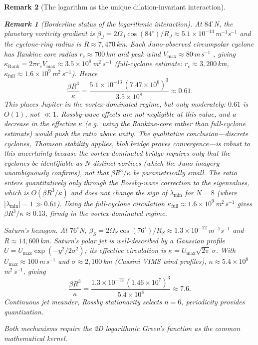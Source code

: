 \documentclass[12pt, a4paper]{article}
\newtheorem{remark}{Remark}[section]
\numberwithin{equation}{section}
\begin{document}
\begin{remark}[The logarithm as the unique dilation-invariant interaction]
\begin{remark}[Borderline status of the logarithmic interaction]
At $84^\circ$N, the planetary vorticity
gradient is $\beta_J = 2\Omega_J\cos(84^\circ)/R_J \approx
5.1\times10^{-13}$\,m$^{-1}$s$^{-1}$ and the cyclone-ring radius
is $R \approx 7{,}470$\,km.  Each Juno-observed circumpolar cyclone has
Rankine core radius $r_c \approx 700$\,km and peak wind $V_{\max}
\approx 80$\,m\,s$^{-1}$ \citep{Adriani2018,Gavriel2021}, giving
$\kappa_{\mathrm{Rank}} = 2\pi r_c V_{\max} \approx 3.5\times10^{8}$\,m$^2$\,s$^{-1}$
(full-cyclone estimate: $r_c \approx 3{,}200$\,km,
$\kappa_{\mathrm{full}} \approx 1.6\times10^9$\,m$^2$\,s$^{-1}$).
Hence
\[
  \frac{\beta R^3}{\kappa}
  = \frac{5.1\times10^{-13}\,(7.47\times10^6)^3}{3.5\times10^8}
  \approx 0.61.
\]
This places Jupiter in the vortex-dominated regime, but only
moderately: $0.61$ is $O(1)$, not $\ll 1$.  Rossby-wave effects
are not negligible at this value, and a decrease in the effective
$\kappa$ (e.g.\ using the Rankine-core rather than full-cyclone
estimate) would push the ratio above unity.  The qualitative
conclusion---discrete cyclones, Thomson stability applies, blob
bridge proves convergence---is robust to this uncertainty because
the vortex-dominated bridge requires only that the cyclones be
identifiable as $N$ distinct vortices (which the Juno imagery
unambiguously confirms), not that $\beta R^3/\kappa$ be
parametrically small.  The ratio enters quantitatively only
through the Rossby-wave correction to the eigenvalues, which is
$O(\beta R^3/\kappa)$ and does not change the sign of
$\lambda_{\min}$ for $N = 8$ (where
$|\lambda_{\min}| = 1 \gg 0.61$).
Using the full-cyclone circulation
$\kappa_{\mathrm{full}} \approx 1.6\times10^9$\,m$^2$\,s$^{-1}$
gives $\beta R^3/\kappa \approx 0.13$, firmly in the
vortex-dominated regime.

\smallskip\noindent
\textit{Saturn's hexagon.}  At $76^\circ$N, $\beta_S =
2\Omega_S\cos(76^\circ)/R_S \approx 1.3\times10^{-12}$\,m$^{-1}$s$^{-1}$
and $R \approx 14{,}600$\,km.  Saturn's polar jet is
well-described by a Gaussian profile $U = U_{\max}\exp(-y^2/2\sigma^2)$;
its effective circulation is $\kappa = U_{\max}\sqrt{2\pi}\,\sigma$.
With $U_{\max} \approx 100$\,m\,s$^{-1}$ and $\sigma \approx 2{,}100$\,km
(Cassini VIMS wind profiles), $\kappa \approx 5.4\times10^{8}$\,m$^2$\,s$^{-1}$,
giving
\[
  \frac{\beta R^3}{\kappa}
  = \frac{1.3\times10^{-12}\,(1.46\times10^7)^3}{5.4\times10^8}
  \approx 7.6.
\]
Continuous jet meander, Rossby stationarity selects $n = 6$, periodicity
provides quantization.

\smallskip\noindent
Both mechanisms require the 2D logarithmic Green's function as the
common mathematical kernel.



\end{remark}
\end{remark}
\end{document}
